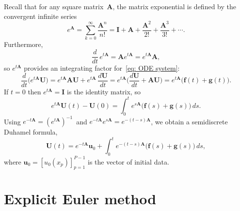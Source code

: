 Recall that for any square matrix~$\boldsymbol{A}$, the matrix exponential
is defined by the convergent infinite series
\[
e^{\boldsymbol{A}}=\sum_{k=0}^\infty\frac{\boldsymbol{A}^n}{n!}
	=\boldsymbol{I}+\boldsymbol{A}+\frac{\boldsymbol{A}^2}{2!}
	+\frac{\boldsymbol{A}^3}{3!}+\cdots.
\]
Furthermore,
\[
\frac{d}{dt}\,e^{t\boldsymbol{A}}=\boldsymbol{A}e^{t\boldsymbol{A}}
	=e^{t\boldsymbol{A}}\boldsymbol{A},
\]
so $e^{t\boldsymbol{A}}$ provides an integrating factor 
for~\eqref{eq: ODE system}:
\[
\frac{d}{dt}\bigl(e^{t\boldsymbol{A}}\boldsymbol{U}\bigr)
	=e^{t\boldsymbol{A}}\boldsymbol{A}\boldsymbol{U}
	+e^{t\boldsymbol{A}}\,\frac{d\boldsymbol{U}}{dt}
	=e^{t\boldsymbol{A}}\biggl(\frac{d\boldsymbol{U}}{dt}
	+\boldsymbol{A}\boldsymbol{U}\biggr)
	=e^{t\boldsymbol{A}}\bigl(\boldsymbol{f}(t)+\boldsymbol{g}(t)\bigr).
\]
If $t=0$ then $e^{t\boldsymbol{A}}=\boldsymbol{I}$ is the identity matrix, so
\[
e^{t\boldsymbol{A}}\boldsymbol{U}(t)-\boldsymbol{U}(0)
	=\int_0^te^{s\boldsymbol{A}}\bigl(
		\boldsymbol{f}(s)+\boldsymbol{g}(s)\bigr)\,ds.
\]
Using $e^{-t\boldsymbol{A}}=(e^{t\boldsymbol{A}})^{-1}$~and 
$e^{-t\boldsymbol{A}}e^{s\boldsymbol{A}}=e^{-(t-s)\boldsymbol{A}}$, we obtain
a semidiscrete Duhamel formula,
\[
\boldsymbol{U}(t)=e^{-t\boldsymbol{A}}\boldsymbol{u}_0
	+\int_0^te^{-(t-s)\boldsymbol{A}}\bigl(
		\boldsymbol{f}(s)+\boldsymbol{g}(s)\bigr)\,ds,
\]
where $\boldsymbol{u}_0=[u_0(x_p)]_{p=1}^{P-1}$ is the vector of initial data.

\section{Explicit Euler method}

